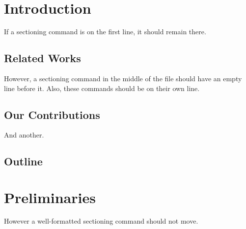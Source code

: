 \section{Introduction}

If a sectioning command is on the first line, it should remain there.

\subsection{Related Works}
However, a sectioning command in the middle of the file should have
an empty line before it.
Also, these commands should be on their own line.

\subsection{Our Contributions}
And another.

\subsection{Outline}

\section{Preliminaries}
However a well-formatted sectioning command should not move.
